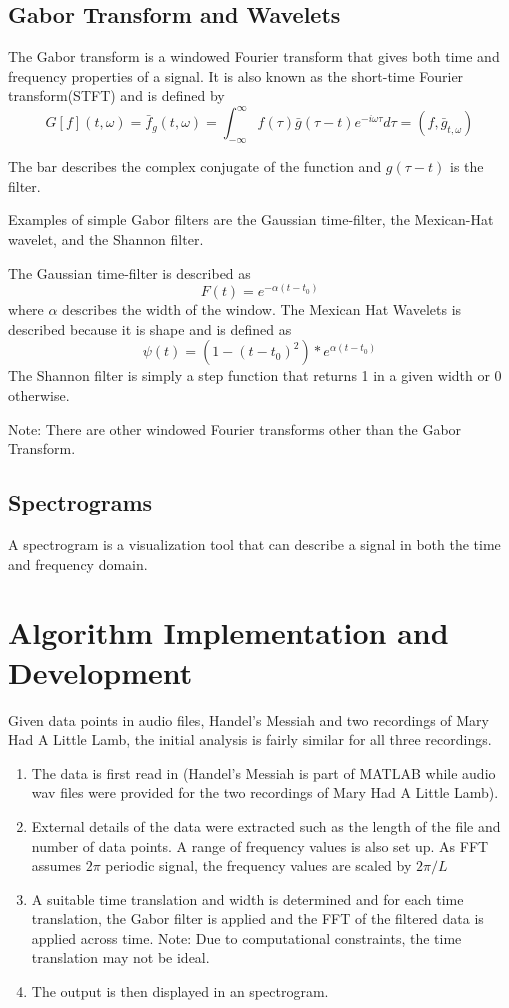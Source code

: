 \documentclass[a4paper,12pt]{article}
\begin{document}
\subsection{Gabor Transform and Wavelets}
The Gabor transform is a windowed Fourier transform that gives both time and frequency properties of a  signal. It is also known as the short-time Fourier transform(STFT) and is defined by
$$
G[f](t, \omega)=\bar{f}_{g}(t, \omega)=\int_{-\infty}^{\infty} f(\tau) \bar{g}(\tau-t) e^{-i \omega \tau} d \tau=\left(f, \bar{g}_{t, \omega}\right)
$$

The bar describes the complex conjugate of the function and $g(\tau - t)$ is the filter.

Examples of simple Gabor filters are the Gaussian time-filter, the Mexican-Hat wavelet, and the Shannon filter.

The Gaussian time-filter is described as
$$
F(t)= e^{-\alpha(t-t_{0})}
$$
where $\alpha$ describes the width of the window.
\newline
\indent The Mexican Hat Wavelets is described because it is shape and is defined as
$$
\psi (t) = (1-(t-t_{0})^2) * e^{\alpha  (t-t_{0})} $$
\smallskip
\indent The Shannon filter is simply a step function that returns 1 in a given width or 0 otherwise.
\newline

Note: There are other windowed Fourier transforms other than the Gabor Transform.

\subsection{Spectrograms}
A spectrogram is a visualization tool that can describe a signal in both the time and frequency domain.


\section{Algorithm Implementation and Development}
Given data points in audio files, Handel's Messiah and two recordings of Mary Had A Little Lamb, the initial analysis is fairly similar for all three recordings.
\begin{enumerate}
\item The data is first read in (Handel's Messiah is part of MATLAB while audio wav files were provided for the two recordings of Mary Had A Little Lamb).

\item External details of the data were extracted such as the length of the file and number of data points. A range of frequency values is also set up. As FFT assumes $2\pi$ periodic signal, the frequency values are scaled by $2\pi / L$
\item A suitable time translation and width is determined and for each time translation, the Gabor filter is applied and the FFT of the filtered data is applied across time. Note: Due to computational constraints, the time translation may not be ideal.
\item The output is then displayed in an spectrogram.
\end{enumerate}
\end{document}
